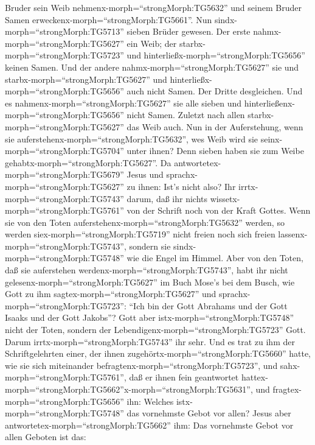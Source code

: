 Bruder sein Weib nehmenx-morph=``strongMorph:TG5632'' und seinem Bruder
Samen erweckenx-morph=``strongMorph:TG5661''.  Nun
sindx-morph=``strongMorph:TG5713'' sieben Brüder gewesen. Der erste
nahmx-morph=``strongMorph:TG5627'' ein Weib; der
starbx-morph=``strongMorph:TG5723'' und
hinterließx-morph=``strongMorph:TG5656'' keinen Samen.  Und
der andere nahmx-morph=``strongMorph:TG5627'' sie und
starbx-morph=``strongMorph:TG5627'' und
hinterließx-morph=``strongMorph:TG5656'' auch nicht Samen. Der Dritte
desgleichen.  Und es nahmenx-morph=``strongMorph:TG5627''
sie alle sieben und hinterließenx-morph=``strongMorph:TG5656'' nicht
Samen. Zuletzt nach allen starbx-morph=``strongMorph:TG5627'' das Weib
auch.  Nun in der Auferstehung, wenn sie
auferstehenx-morph=``strongMorph:TG5632'', wes Weib wird sie
seinx-morph=``strongMorph:TG5704'' unter ihnen? Denn sieben haben sie
zum Weibe gehabtx-morph=``strongMorph:TG5627''.  Da
antwortetex-morph=``strongMorph:TG5679'' Jesus und
sprachx-morph=``strongMorph:TG5627'' zu ihnen: Ist's nicht also? Ihr
irrtx-morph=``strongMorph:TG5743'' darum, daß ihr nichts
wissetx-morph=``strongMorph:TG5761'' von der Schrift noch von der Kraft
Gottes.  Wenn sie von den Toten
auferstehenx-morph=``strongMorph:TG5632'' werden, so werden
siex-morph=``strongMorph:TG5719'' nicht freien noch sich freien
lassenx-morph=``strongMorph:TG5743'', sondern sie
sindx-morph=``strongMorph:TG5748'' wie die Engel im Himmel.
 Aber von den Toten, daß sie auferstehen
werdenx-morph=``strongMorph:TG5743'', habt ihr nicht
gelesenx-morph=``strongMorph:TG5627'' im Buch Mose's bei dem Busch, wie
Gott zu ihm sagtex-morph=``strongMorph:TG5627'' und
sprachx-morph=``strongMorph:TG5723'': ``Ich bin der Gott Abrahams und
der Gott Isaaks und der Gott Jakobs''?  Gott aber
istx-morph=``strongMorph:TG5748'' nicht der Toten, sondern der
Lebendigenx-morph=``strongMorph:TG5723'' Gott. Darum
irrtx-morph=``strongMorph:TG5743'' ihr sehr.  Und es trat
zu ihm der Schriftgelehrten einer, der ihnen
zugehörtx-morph=``strongMorph:TG5660'' hatte, wie sie sich miteinander
befragtenx-morph=``strongMorph:TG5723'', und
sahx-morph=``strongMorph:TG5761'', daß er ihnen fein geantwortet
hattex-morph=``strongMorph:TG5662''x-morph=``strongMorph:TG5631'', und
fragtex-morph=``strongMorph:TG5656'' ihn: Welches
istx-morph=``strongMorph:TG5748'' das vornehmste Gebot vor allen?
 Jesus aber antwortetex-morph=``strongMorph:TG5662'' ihm:
Das vornehmste Gebot vor allen Geboten ist das:
